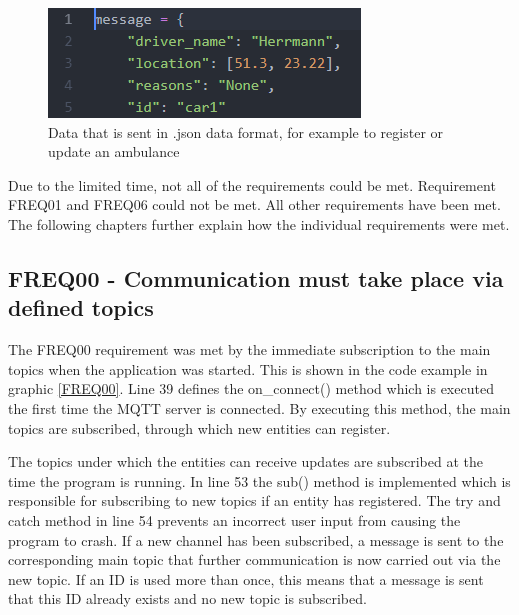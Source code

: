 \begin{figure}
\sidecaption
\includegraphics[scale=0.6]{images/walter/code/json.png}
\caption{Data that is sent in .json data format, for example to register or update an ambulance}
\label{json}
\end{figure}

Due to the limited time, not all of the requirements could be met. Requirement FREQ01 and FREQ06 could not be met. All other requirements have been met. The following chapters further explain how the individual requirements were met.


\subsection{FREQ00 - Communication must take place via defined topics}
The FREQ00 requirement was met by the immediate subscription to the main topics when the application was started. This is shown in the code example in graphic \ref{FREQ00}. Line 39 defines the on\_connect() method which is executed the first time the MQTT server is connected. By executing this method, the main topics are subscribed, through which new entities can register. 

The topics under which the entities can receive updates are subscribed at the time the program is running. In line 53 the sub() method is implemented which is responsible for subscribing to new topics if an entity has registered. The try and catch method in line 54 prevents an incorrect user input from causing the program to crash. If a new channel has been subscribed, a message is sent to the corresponding main topic that further communication is now carried out via the new topic.
If an ID is used more than once, this means that a message is sent that this ID already exists and no new topic is subscribed.

